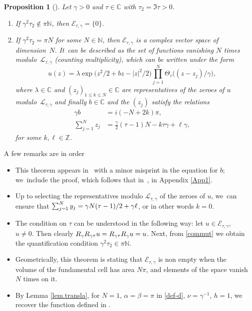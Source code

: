 \documentclass[10pt]{amsart}
\newtheorem{prop}[theorem]{Proposition}
\theoremstyle{definition}
\let\EE\exp
\let\dis\relax
\newcommand\C{\mathbb C}
\begin{document}
\begin{prop}[\cite{AftaSerfa}]\label{prop41}
Let $\gamma>0$ and $\tau \in \C$ with $\tau_2=\Im \tau >0$.
\begin{enumerate}
\item If $\gamma^2 \tau_2 \notin\pi \mathbb{N}$, then $\mathcal{E}_{\tau,\gamma} =\{ 0 \}$.
\item If $\gamma^2 \tau_2 = \pi N$ for some $N \in \mathbb{N}$, then $\mathcal{E}_{\tau,\gamma}$ is a complex vector space of dimension~$N$. It~can be described as the set of functions vanishing $N$ times modulo~$\mathcal{L}_{\tau,\gamma}$ (counting multiplicity), which can be written under the form
\begin{equation}\label{formprop}
u(z)=\lambda \EE\bigl(z^2/2 + b z- |z|^2/2\bigr) \prod_{j=1}^N\Theta_{\tau}\bigl(({z-z_j})/{\gamma} \bigr),
\end{equation}
where $\lambda \in \C$ and $(z_j)_{1\leq k\leq N}\in \C$ are representatives of the zeroes of $u$ modulo~$\mathcal{L}_{\tau,\gamma}$ and finally $b \in \mathbb{C}$ and the $(z_j)$ satisfy the relations
\begin{align}\label{somme}
\gamma b &= i(- N + 2k) \pi, \nonumber \\
\sum_{j=1}^N z_j &= \frac{\gamma}{2} (\tau - 1) N - k \tau \gamma + \ell \gamma,
\end{align}
for some $k,\ell \in \mathbb{Z}$.
\end{enumerate}
\end{prop}

A few remarks are in order
\begin{itemize}
\item This theorem appears in~\cite{AftaSerfa} with a minor misprint in the equation for $b$; we~include the proof, which follows that in~\cite{AftaSerfa}, in Appendix \ref{App1}.
\item Up to selecting the representatives modulo $\mathcal{L}_{\tau,\gamma}$ of the zeroes of $u$, we~can ensure that $\dis \sum_{j=1}^N y_j = {\gamma N}(\tau-1)/2+\gamma \ell$, or in other words $k=0$.
\item The condition on $\tau$ can be understood in the following way: let $u \in \mathcal{E}_{\tau,\gamma}$, $u \neq 0$. Then clearly $\dis R_\gamma R_{\gamma \tau} u= R_{\gamma \tau}R_\gamma u =u$. Next, from \eqref{commut} we obtain the quantification condition $\gamma^2 \tau_2 \in\pi \mathbb{N}$.
\item Geometrically, this theorem is stating that $\mathcal{E}_{\tau,\gamma}$ is non empty when the volume of the fundamental cell has area $N\pi$, and elements of the space vanish $N$ times on it.
\item By Lemma \ref{lem.transla}, for $N=1$, $\alpha=\beta=\pi$ in \eqref{def-d}, $\nu=\gamma^{-1}$, $h=1$, we recover the function defined in \cite[Prop.\,4.1]{ABN}.
\end{itemize}
\end{document}
